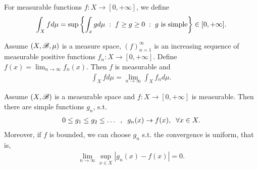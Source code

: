\begin{definition}
    For measurable functions $f:X\rightarrow [0,+\infty]$, we define \begin{align*}
        \int_X fd\mu = \sup\left\{\int_xgd\mu \hspace{1mm}:\hspace{1mm} f\geq g\geq 0\hspace{1mm}:\hspace{1mm} g \text{ is simple}\right\}\in[0,+\infty].
    \end{align*}
\end{definition}

\begin{theorem}
    Assume $(X,\mathscr{B},\mu)$ is a measure space, $(f)_{n=1}^\infty$ is an increasing sequence of measurable positive functions $f_n:X\rightarrow [0,+\infty]$. Define $f(x)=\lim_{n\rightarrow \infty}f_n(x)$. 
    Then $f$ is measurable and  \begin{align*}
        \int_X fd\mu = \lim_{n\rightarrow \infty} \int_X f_nd\mu.
    \end{align*}
    
\end{theorem}

\begin{theorem}
    Assume $(X,\mathscr{B})$ is a measurable space and $f:X\rightarrow [0,+\infty]$ is measurable. Then there are simple functions $g_n$, s.t. \begin{align*}
        0\leq g_1\leq g_2\leq\ldots \hspace{2mm},\hspace{2mm} g_n(x)\rightarrow f(x),\hspace{2mm}\forall x\in X.
    \end{align*}
    Moreover, if $f$ is bounded, we can choose $g_n$ s.t. the convergence is uniform, that is, \begin{align*}
        \lim_{n\rightarrow\infty}\sup_{x\in X}|g_n(x)-f(x)|=0.
    \end{align*}
\end{theorem}